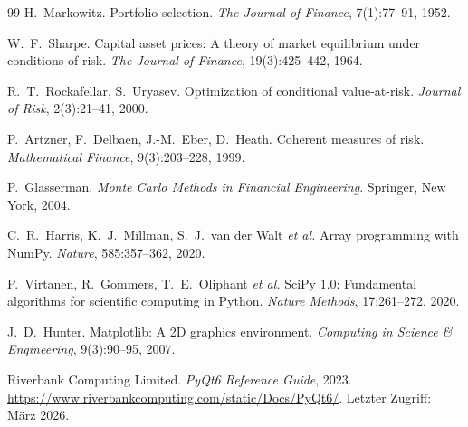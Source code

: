 \documentclass[a4paper,12pt]{article}
\begin{document}
\begin{thebibliography}{99}
H.~Markowitz.
\newblock Portfolio selection.
\newblock \textit{The Journal of Finance}, 7(1):77--91, 1952.

W.~F.~Sharpe.
\newblock Capital asset prices: A theory of market equilibrium under
  conditions of risk.
\newblock \textit{The Journal of Finance}, 19(3):425--442, 1964.

R.~T.~Rockafellar, S.~Uryasev.
\newblock Optimization of conditional value-at-risk.
\newblock \textit{Journal of Risk}, 2(3):21--41, 2000.

P.~Artzner, F.~Delbaen, J.-M.~Eber, D.~Heath.
\newblock Coherent measures of risk.
\newblock \textit{Mathematical Finance}, 9(3):203--228, 1999.

P.~Glasserman.
\newblock \textit{Monte Carlo Methods in Financial Engineering}.
\newblock Springer, New York, 2004.

C.~R.~Harris, K.~J.~Millman, S.~J.~van der Walt \textit{et al.}
\newblock Array programming with NumPy.
\newblock \textit{Nature}, 585:357--362, 2020.

P.~Virtanen, R.~Gommers, T.~E.~Oliphant \textit{et al.}
\newblock SciPy 1.0: Fundamental algorithms for scientific computing
  in Python.
\newblock \textit{Nature Methods}, 17:261--272, 2020.

J.~D.~Hunter.
\newblock Matplotlib: A 2D graphics environment.
\newblock \textit{Computing in Science \& Engineering}, 9(3):90--95, 2007.

Riverbank Computing Limited.
\newblock \textit{PyQt6 Reference Guide}, 2023.
\newblock \url{https://www.riverbankcomputing.com/static/Docs/PyQt6/}.
  Letzter Zugriff: März 2026.

\end{thebibliography}
\end{document}
